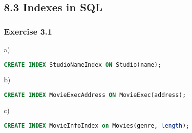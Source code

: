 \documentclass[../../main.tex]{subfiles}
\begin{document}
\subsection{8.3 Indexes in SQL}

\subsubsection*{Exercise 3.1}

a)

\begin{lstlisting}[language=sql]
  CREATE INDEX StudioNameIndex ON Studio(name);
\end{lstlisting}

b)

\begin{lstlisting}[language=sql]
  CREATE INDEX MovieExecAddress ON MovieExec(address);
\end{lstlisting}

c)

\begin{lstlisting}[language=sql]
  CREATE INDEX MovieInfoIndex on Movies(genre, length);
\end{lstlisting}
\end{document}
